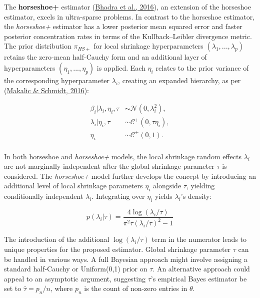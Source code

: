 \documentclass[
  11pt,
]{article}
\begin{document}
The \textbf{horseshoe+} estimator
(\protect\hyperlink{ref-Bhadra2016}{Bhadra et al., 2016}), an extension
of the horseshoe estimator, excels in ultra-sparse problems. In contrast
to the horseshoe estimator, the \emph{horseshoe+} estimator has a lower
posterior mean squared error and faster posterior concentration rates in
terms of the Kullback--Leibler divergence metric. The prior distribution
\(\pi_{HS+}\) for local shrinkage hyperparameters
\((\lambda_1, . . . , \lambda_p)\) retains the zero-mean half-Cauchy
form and an additional layer of hyperparameters
\((\eta_1, . . . , \eta_p)\) is applied. Each \(\eta_i\) relates to the
prior variance of the corresponding hyperparameter \(\lambda_i\),
creating an expanded hierarchy, as per
(\protect\hyperlink{ref-Makalic2016}{Makalic \& Schmidt, 2016}):

\begin{align}
\beta_i | \lambda_i, \eta_i, \tau &\sim \mathcal{N}(0, \lambda_i^2), \\
\lambda_i | \eta_i, \tau &\sim \mathcal{C}^+(0, \tau \eta_i), \\
\eta_i &\sim \mathcal{C}^+(0,1). \\
\end{align}

In both horseshoe and \emph{horseshoe+} models, the local shrinkage
random effects \(\lambda_i\) are not marginally independent after the
global shrinkage parameter \(\tau\) is considered. The \emph{horseshoe+}
model further develops the concept by introducing an additional level of
local shrinkage parameters \(\eta_i\) alongside \(\tau\), yielding
conditionally independent \(\lambda_i\). Integrating over \(\eta_i\)
yields \(\lambda_i\)'s density:

\begin{equation}
p(\lambda_i|\tau) = \frac{4 \log(\lambda_i/\tau)}{\pi^2\tau(\lambda_i/\tau)^2 -1} \tag{7}
\end{equation}

The introduction of the additional \(\log(\lambda_i/\tau)\) term in the
numerator leads to unique properties for the proposed estimator. Global
shrinkage parameter \(\tau\) can be handled in various ways. A full
Bayesian approach might involve assigning a standard half-Cauchy or
Uniform(0,1) prior on \(\tau\). An alternative approach could appeal to
an asymptotic argument, suggesting \(\tau\)'s empirical Bayes estimator
be set to \(\hat{\tau} = p_n/n\), where \(p_n\) is the count of non-zero
entries in \(\theta\).
\end{document}
